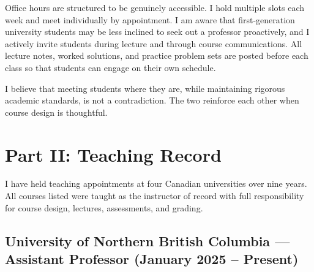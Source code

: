 \documentclass[11pt,letterpaper]{article}
\begin{document}
Office hours are structured to be genuinely accessible. I hold multiple slots each week and meet individually by appointment. I am aware that first-generation university students may be less inclined to seek out a professor proactively, and I actively invite students during lecture and through course communications. All lecture notes, worked solutions, and practice problem sets are posted before each class so that students can engage on their own schedule.

I believe that meeting students where they are, while maintaining rigorous academic standards, is not a contradiction. The two reinforce each other when course design is thoughtful.

\section{Part II: Teaching Record}

I have held teaching appointments at four Canadian universities over nine years. All courses listed were taught as the instructor of record with full responsibility for course design, lectures, assessments, and grading.

\subsection{University of Northern British Columbia --- Assistant Professor (January 2025 -- Present)}

\vspace{4pt}
\end{document}
